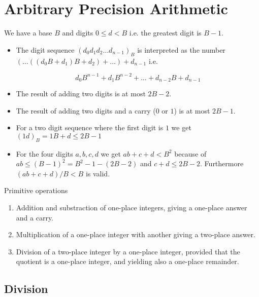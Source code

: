 \section{Arbitrary Precision Arithmetic}

We have a base $B$ and digits $0 \le d < B$ i.e. the greatest digit is $B-1$.
\begin{itemize}

\item The digit sequence $(d_0 d_1 d_2 \ldots d_{n-1})_B$ is interpreted as the number
  $(\ldots((d_0 B + d_1)B + d_2) + \ldots) + d_{n-1}$ i.e.

    $$ d_0 B^{n-1} + d_1 B^{n-2} + \ldots + d_{n-2} B + d_{n-1} $$


\item The result of adding two digits is at most $2B-2$.

\item The result of adding two digits and a carry ($0$ or $1$) is at most
  $2B-1$.

\item For a two digit sequence where the first digit is $1$ we get
  $(1 d)_B = 1 B + d \le 2 B - 1$

\item For the four digits $a,b,c,d$ we get $a b + c + d < B^2$ because of $a b
  \le (B - 1)^2 = B^2 - 1 - (2B-2)$ and $c + d \le 2B-2$. Furthermore $(a b +
  c + d)/B < B$ is valid.
 \end{itemize}


Primitive operations
\begin{enumerate}
\item Addition and substraction of one-place integers, giving a one-place
  answer and a carry.

\item Multiplication of a one-place integer with another giving a two-place
  answer.

\item Division of a two-place integer by a one-place integer, provided that
  the quotient is a one-place integer, and yielding also a one-place
  remainder.

\end{enumerate}






\subsection{Division}



